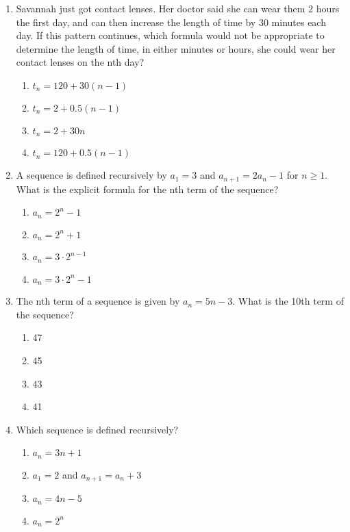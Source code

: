 \documentclass[12pt, twoside]{article}
\begin{document}
\begin{enumerate}[itemsep=0.5cm]
\item Savannah just got contact lenses. Her doctor said she can wear them 2 hours the first day, and can then increase the length of time by 30 minutes each day. If this pattern continues, which formula would not be appropriate to determine the length of time, in either minutes or hours, she could wear her contact lenses on the nth day?
\begin{enumerate}
    \item $t_n = 120 + 30(n-1)$
    \item $t_n = 2 + 0.5(n-1)$
    \item $t_n = 2 + 30n$
    \item $t_n = 120 + 0.5(n-1)$
\end{enumerate}

\item A sequence is defined recursively by $a_1 = 3$ and $a_{n+1} = 2a_n - 1$ for $n \geq 1$. What is the explicit formula for the nth term of the sequence?
\begin{enumerate}
    \item $a_n = 2^n - 1$
    \item $a_n = 2^n + 1$
    \item $a_n = 3 \cdot 2^{n-1}$
    \item $a_n = 3 \cdot 2^n - 1$
\end{enumerate}

\item The nth term of a sequence is given by $a_n = 5n - 3$. What is the 10th term of the sequence?
\begin{enumerate}
    \item 47
    \item 45
    \item 43
    \item 41
\end{enumerate}

\item Which sequence is defined recursively?
\begin{enumerate}
    \item $a_n = 3n + 1$
    \item $a_1 = 2$ and $a_{n+1} = a_n + 3$
    \item $a_n = 4n - 5$
    \item $a_n = 2^n$
\end{enumerate}


\end{enumerate}
\end{document}
